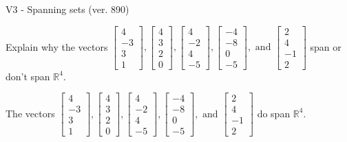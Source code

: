 \begin{exercise}
  \begin{exerciseTitle}V3 - Spanning sets (ver. 890)\end{exerciseTitle}
  \begin{exerciseStatement}
    Explain why the vectors \(\left[\begin{array}{r}
4 \\
-3 \\
3 \\
1
\end{array}\right] , \left[\begin{array}{r}
4 \\
3 \\
2 \\
0
\end{array}\right] , \left[\begin{array}{r}
4 \\
-2 \\
4 \\
-5
\end{array}\right] , \left[\begin{array}{r}
-4 \\
-8 \\
0 \\
-5
\end{array}\right] , \text{ and } \left[\begin{array}{r}
2 \\
4 \\
-1 \\
2
\end{array}\right]\) span or don't span \(\mathbb{R}^4\). 
	


  \end{exerciseStatement}
  \begin{exerciseAnswer}
   The vectors \(\left[\begin{array}{r}
4 \\
-3 \\
3 \\
1
\end{array}\right] , \left[\begin{array}{r}
4 \\
3 \\
2 \\
0
\end{array}\right] , \left[\begin{array}{r}
4 \\
-2 \\
4 \\
-5
\end{array}\right] , \left[\begin{array}{r}
-4 \\
-8 \\
0 \\
-5
\end{array}\right] , \text{ and } \left[\begin{array}{r}
2 \\
4 \\
-1 \\
2
\end{array}\right]\) 
  	 do  
	span \(\mathbb{R}^4\).
  


  \end{exerciseAnswer}
\end{exercise}